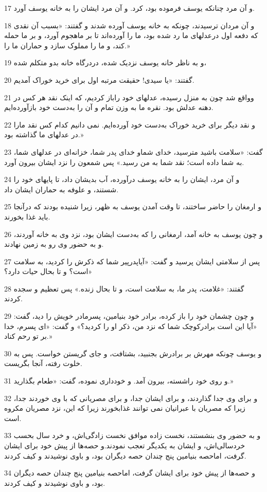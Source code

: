 \par 17 و آن مرد چنانکه یوسف فرموده بود، کرد. و آن مرد ایشان را به خانه یوسف آورد.
\par 18 و آن مردان ترسیدند، چونکه به خانه یوسف آورده شدند و گفتند: «بسبب آن نقدی که دفعه اول درعدلهای ما رد شده بود، ما را آورده‌اند تا بر ماهجوم آورد، و بر ما حمله کند، و ما را مملوک سازد و حماران ما را.»
\par 19 و به ناظر خانه یوسف نزدیک شده، دردرگاه خانه بدو متکلم شده،
\par 20 گفتند: «یا سیدی! حقیقت مرتبه اول برای خرید خوراک آمدیم.
\par 21 وواقع شد چون به منزل رسیده، عدلهای خود راباز کردیم، که اینک نقد هر کس در دهنه عدلش بود. نقره ما به وزن تمام و آن را به‌دست خود بازآورده‌ایم.
\par 22 و نقد دیگر برای خرید خوراک به‌دست خود آورده‌ایم. نمی دانیم کدام کس نقد مارا در عدلهای ما گذاشته بود.»
\par 23 گفت: «سلامت باشید مترسید، خدای شماو خدای پدر شما، خزانه‌ای در عدلهای شما، به شما داده است؛ نقد شما به من رسید.» پس شمعون را نزد ایشان بیرون آورد.
\par 24 و آن مرد، ایشان را به خانه یوسف درآورده، آب بدیشان داد، تا پایهای خود را شستند، و علوفه به حماران ایشان داد.
\par 25 و ارمغان را حاضر ساختند، تا وقت آمدن یوسف به ظهر، زیرا شنیده بودند که درآنجا باید غذا بخورند.
\par 26 و چون یوسف به خانه آمد، ارمغانی را که به‌دست ایشان بود، نزد وی به خانه آوردند، و به حضور وی رو به زمین نهادند.
\par 27 پس از سلامتی ایشان پرسید و گفت: «آیاپدر‌پیر شما که ذکرش را کردید، به سلامت است؟ و تا بحال حیات دارد؟»
\par 28 گفتند: «غلامت، پدر ما، به سلامت است، و تا بحال زنده.» پس تعظیم و سجده کردند.
\par 29 و چون چشمان خود را باز کرده، برادر خود بنیامین، پسرمادر خویش را دید، گفت: «آیا این است برادرکوچک شما که نزد من، ذکر او را کردید؟» و گفت: «ای پسرم، خدا بر تو رحم کناد.»
\par 30 و یوسف چونکه مهرش بر برادرش بجنبید، بشتافت، و جای گریستن خواست. پس به خلوت رفته، آنجا بگریست.
\par 31 و روی خود راشسته، بیرون آمد. و خودداری نموده، گفت: «طعام بگذارید.»
\par 32 و برای وی جدا گذاردند، و برای ایشان جدا، و برای مصریانی که با وی خوردند جدا، زیرا که مصریان با عبرانیان نمی توانند غذابخورند زیرا که این، نزد مصریان مکروه است.
\par 33 و به حضور وی بنشستند، نخست زاده موافق نخست زادگی‌اش، و خرد سال بحسب خردسالی‌اش، و ایشان به یکدیگر تعجب نمودند.و حصه‌ها از پیش خود برای ایشان گرفت، اماحصه بنیامین پنج چندان حصه دیگران بود، و باوی نوشیدند و کیف کردند.
\par 34 و حصه‌ها از پیش خود برای ایشان گرفت، اماحصه بنیامین پنج چندان حصه دیگران بود، و باوی نوشیدند و کیف کردند.
 
